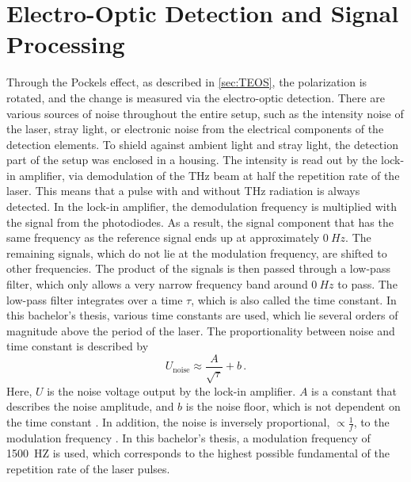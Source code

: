 

\section{Electro-Optic Detection and Signal Processing}
\label{sec:EOS}

Through the Pockels effect, as described in \autoref{sec:TEOS}, the polarization is rotated, and
the change is measured via the electro-optic detection.
There are various sources of noise throughout the entire setup, such as the intensity noise of
the laser, stray light, or electronic noise from the electrical components of the detection
elements.
To shield against ambient light and stray light, the detection part of the setup was enclosed in
a housing.
The intensity is read out by the lock-in amplifier, via demodulation of the THz beam at half the
repetition rate of the laser.
This means that a pulse with and without THz radiation is always detected.
In the lock-in amplifier, the demodulation frequency is multiplied with the signal from the
photodiodes.
As a result, the signal component that has the same frequency as the reference signal ends up at
approximately $\SI{0}{Hz}$.
The remaining signals, which do not lie at the modulation frequency, are shifted to other
frequencies.
The product of the signals is then passed through a low-pass filter, which only allows a very
narrow frequency band around $\SI{0}{Hz}$ to pass.
The low-pass filter integrates over a time $\tau$, which is also called the time constant. In
this bachelor's thesis, various time constants are used, which lie several orders of magnitude
above the period of the laser.
The proportionality between noise and time constant is described by
\begin{equation}
    \label{eqn:tc}
    U_\text{noise} \approx \frac{A}{\sqrt{\tau}}+b\,.
\end{equation}
Here, $U$ is the noise voltage output by the lock-in amplifier.
$A$ is a constant that describes the noise amplitude, and $b$ is the noise floor, which is
not dependent on the time constant \cite{zhinst_lockin_whitepaper}.
In addition, the noise is inversely proportional, $\propto \frac 1 f$, to the modulation
frequency \cite{10.1063/1.5047659}.
In this bachelor's thesis, a modulation frequency of \SI{1500}{HZ} is used, which corresponds to
the highest possible fundamental of the repetition rate of the laser pulses.
\\ \\

